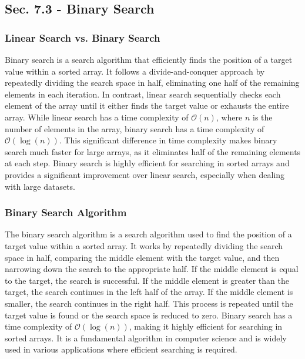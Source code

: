 \subsection*{Sec. 7.3 - Binary Search}

\subsubsection{Linear Search vs. Binary Search}

Binary search is a search algorithm that efficiently finds the position of a target value within a sorted array. It follows a divide-and-conquer approach by repeatedly dividing the search space in half, eliminating one half of the remaining elements in each iteration. In contrast, linear search sequentially checks each element 
of the array until it either finds the target value or exhausts the entire array. While linear search has a time complexity of $\mathcal{O}(n)$, where $n$ is the number of elements in the array, binary search has a time complexity of $\mathcal{O}(\log{(n)})$. This significant difference in time complexity makes binary search much faster for large arrays, 
as it eliminates half of the remaining elements at each step. Binary search is highly efficient for searching in sorted arrays and provides a significant improvement over linear search, especially when dealing with large datasets.

\subsubsection{Binary Search Algorithm}

The binary search algorithm is a search algorithm used to find the position of a target value within a sorted array. It works by repeatedly dividing the search space in half, comparing the middle element with the target value, and then narrowing down the search to the appropriate half. If the middle element is equal to the target, 
the search is successful. If the middle element is greater than the target, the search continues in the left half of the array. If the middle element is smaller, the search continues in the right half. This process is repeated until the target value is found or the search space is reduced to zero. Binary search has a time complexity 
of $\mathcal{O}(\log{(n)})$, making it highly efficient for searching in sorted arrays. It is a fundamental algorithm in computer science and is widely used in various applications where efficient searching is required.

